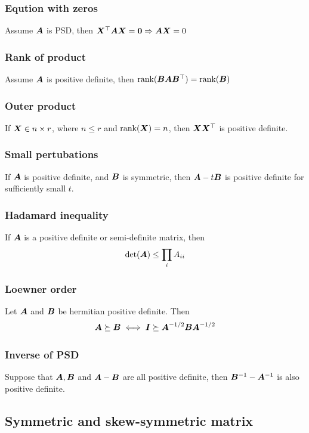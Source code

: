 \documentclass[10pt]{article}
\begin{document}
\subsubsection{Eqution with zeros}
Assume ${\bm{A}}$ is PSD, then ${\bm{X}}^{\top} {\bm{A}} {\bm{X}} = \bm{0} \Rightarrow {\bm{A}} {\bm{X}} =0 $
\subsubsection{Rank of product}
Assume ${\bm{A}}$ is positive definite, then $\text{rank}({\bm{B}}{\bm{A}}{\bm{B}}^{\top}) = \text{rank}({\bm{B}})$  
\subsubsection{Outer product}
If ${\bm{X}} \in n \times r$, where $n \leq r$ and $\text{rank}({\bm{X}}) = n$, then ${\bm{X}}{\bm{X}}^{\top}$ is positive definite. 
\subsubsection{Small pertubations}
If ${\bm{A}}$ is positive definite, and ${\bm{B}}$ is symmetric, then ${\bm{A}} - t {\bm{B}}$ is positive definite for sufficiently small $t$. 
\subsubsection{Hadamard inequality}
If ${\bm{A}}$ is a positive definite or semi-definite matrix, then 
\begin{equation}
\det ({\bm{A}}) \leq \prod_i A_{ii}
\end{equation}
\subsubsection{Loewner order}
 Let ${\bm{A}}$ and ${\bm{B}}$ be hermitian positive definite. Then 
\begin{equation}
    {\bm{A}} \succeq {\bm{B}} \iff {\bm{I}} \succeq {\bm{A}}^{-1/2} {\bm{B}} {\bm{A}}^{-1/2}
\end{equation}
\subsubsection{Inverse of PSD}
 Suppose that ${\bm{A}}, {\bm{B}}$ and ${\bm{A}} - {\bm{B}}$ are all positive definite, then ${\bm{B}}^{-1} - {\bm{A}}^{-1}$ is also positive definite.   
\subsection{Symmetric and skew-symmetric matrix}
\end{document}

